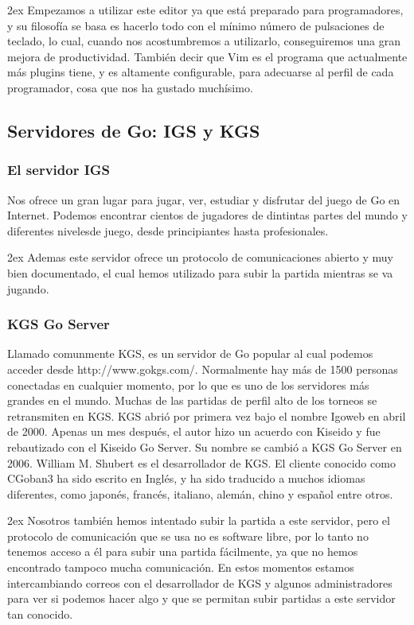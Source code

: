 \documentclass[12pt,a4paper]{report}
\begin{document}
\parskip 2ex 
Empezamos a utilizar este editor ya que está preparado para
programadores, y su filosofía se basa es hacerlo todo con el mínimo número de
pulsaciones de teclado, lo cual, cuando nos acostumbremos a utilizarlo,
conseguiremos una gran mejora de productividad. También decir que Vim es el
programa que actualmente más plugins tiene, y es altamente configurable, para
adecuarse al perfil de cada programador, cosa que nos ha gustado muchísimo. 


\subsection{Servidores de Go: IGS y KGS} %

\subsubsection{El servidor IGS}

Nos ofrece un gran lugar para jugar, ver, estudiar y disfrutar del juego de Go
en Internet. Podemos encontrar cientos de jugadores de dintintas partes del
mundo y diferentes nivelesde juego, desde principiantes hasta profesionales. 

\parskip 2ex
Ademas este servidor ofrece un protocolo de comunicaciones abierto y muy bien
documentado, el cual hemos utilizado para subir la partida mientras se va
jugando. 

\subsubsection{KGS Go Server}

Llamado comunmente KGS, es un servidor de Go popular al cual podemos acceder
desde http://www.gokgs.com/. Normalmente hay más de 1500 personas conectadas en
cualquier momento, por lo que es uno de los servidores más grandes en el mundo.
Muchas de las partidas de perfil alto de los torneos se retransmiten en KGS. KGS
abrió por primera vez bajo el nombre Igoweb en abril de 2000.  Apenas un mes
después, el autor hizo un acuerdo con Kiseido y fue rebautizado con el Kiseido
Go Server. Su nombre se cambió a KGS Go Server en 2006. William M. Shubert es el
desarrollador de KGS. El cliente conocido como CGoban3 ha sido escrito en
Inglés, y ha sido traducido a muchos idiomas diferentes, como japonés, francés,
italiano, alemán, chino y español entre otros. 

\parskip 2ex
Nosotros también hemos intentado subir la partida a este servidor, pero el
protocolo de comunicación que se usa no es software libre, por lo tanto no
tenemos acceso a él para subir una partida fácilmente, ya que no hemos
encontrado tampoco mucha comunicación. En estos momentos estamos intercambiando
correos con el desarrollador de KGS y algunos administradores para ver si
podemos hacer algo y que se permitan subir partidas a este servidor tan
conocido. 
\end{document}
